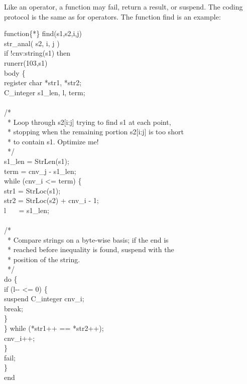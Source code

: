 Like an operator, a function may fail, return a result, or
suspend. The coding protocol is the same as for operators.  The
function find is an example:

\begin{iconcode}
function\{*\} find(s1,s2,i,j)\\
\>str\_anal( s2, i, j )\\
\>if !cnv:string(s1) then\\
\>\>runerr(103,s1)\\
\>body \{\\
\>\>register char *str1, *str2;\\
\>\>C\_integer s1\_len, l, term;\\
\\
\>\>/*\\
\>\>\ * Loop through s2[i:j] trying to find s1 at each point,\\
\>\>\ * stopping when the remaining portion s2[i:j] is too short\\
\>\>\ * to contain s1. Optimize me!\\
\>\>\ */\\
\>\>s1\_len = StrLen(s1);\\
\>\>term = cnv\_j - s1\_len;\\
\>\>while (cnv\_i <= term) \{\\
\>\>\>str1 = StrLoc(s1);\\
\>\>\>str2 = StrLoc(s2) + cnv\_i - 1;\\
\>\>\>l \ \ \ = s1\_len;\\
\\
\>\>\>/*\\
\>\>\>\ * Compare strings on a byte-wise basis; if the end is\\
\>\>\>\ * reached before inequality is found, suspend with the\\
\>\>\>\ * position of the string.\\
\>\>\>\ */\\
\>\>\>do \{\\
\>\>\>\>if (l-{}- <= 0) \{\\
\>\>\>\>\>suspend C\_integer cnv\_i;\\
\>\>\>\>\>break;\\
\>\>\>\>\>\}\\
\>\>\>\>\} while (*str1++ == *str2++);\\
\>\>\>cnv\_i++;\\
\>\>\>\}\\
\>\>fail;\\
\>\>\}\\
end
\end{iconcode}

